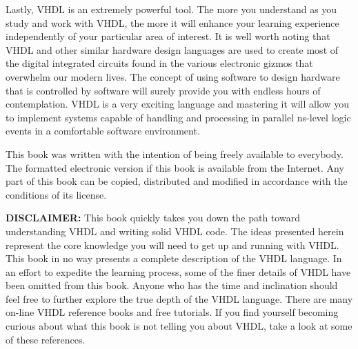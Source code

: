Lastly, VHDL is an extremely powerful tool. The more you understand as you study and work with VHDL, the more it will enhance your learning experience independently of your particular area of interest. It is well worth noting that VHDL and other similar hardware design languages are used to create most of the digital integrated circuits found in the various electronic gizmos that overwhelm our modern lives. The concept of using software to design hardware that is controlled by software will surely provide you with endless hours of contemplation. VHDL is a very exciting language and mastering it will allow you to implement systems capable of handling and processing in parallel ns-level logic events in a comfortable software environment.

This book was written with the intention of being freely available to everybody. The formatted electronic version if this book is available from the Internet. Any part of this book can be copied, distributed and modified in accordance with the conditions of its license.
\vspace{10pt}

\noindent
\textbf{DISCLAIMER:}
This book quickly takes you down the path toward understanding VHDL and writing solid VHDL code. The ideas presented herein represent the core knowledge you will need to get up and running with VHDL. This book in no way presents a complete description of the VHDL language. In an effort to expedite the learning process, some of the finer details of VHDL have been omitted from this book. Anyone who has the time and inclination should feel free to further explore the true depth of the VHDL language. There are many on-line VHDL reference books and free tutorials. If you find yourself becoming curious about what this book is not telling you about VHDL, take a look at some of these references.

